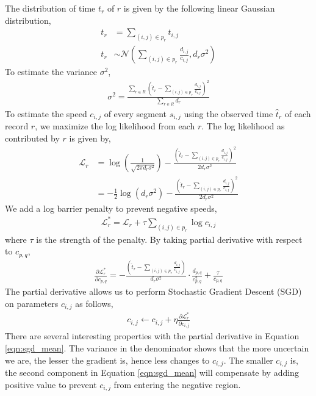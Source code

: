 \documentclass[conference]{IEEEtran.1.8}
\begin{document}
The distribution of time $t_r$ of $r$ is given by the following linear Gaussian distribution,
\begin{align*}
	t_r &= \sum_{ (i,j) \in p_r } t_{i,j} \\
	t_r &\sim \mathcal{N} \left( \sum_{ (i,j) \in p_r } \frac{ d_{i,j} }{ c_{i,j} }, d_r \sigma^2 \right)
\end{align*}
To estimate the variance $\sigma^2$,
\begin{align*}
	\sigma^2 = \frac{ \sum_{r \in R} \left( \hat{t}_r - \sum_{ (i,j) \in p_r } \frac{d_{i,j}}{c_{i,j}} \right)^2}{\sum_{r \in R} d_r}
\end{align*}
To estimate the speed $c_{i,j}$ of every segment $s_{i,j}$ using the observed time $\hat{t}_r$ of each record $r$, we maximize the log likelihood from each $r$. The log likelihood as contributed by $r$ is given by,
\begin{align*}
	\mathcal{L}_r &= \log \left( \frac{1}{\sqrt{2 \pi d_r \sigma^2 }} \right) - \frac{\left( \hat{t}_r - \sum_{ (i,j) \in p_r } \frac{d_{i,j}}{c_{i,j}} \right)^2}{2 d_r \sigma^2 } \\
	&= - \frac{1}{2} \log \left( d_r \sigma^2 \right) - \frac{\left( \hat{t}_r - \sum_{ (i,j) \in p_r } \frac{d_{i,j}}{c_{i,j}} \right)^2}{2 d_r \sigma^2 }
\end{align*}
We add a log barrier penalty to prevent negative speeds,
\begin{align}
	\label{eqn:objective1}
	\mathcal{L}^*_r = \mathcal{L}_r + \tau \sum_{(i,j) \in p_r} \log c_{i,j}
\end{align}
where $\tau$ is the strength of the penalty. By taking partial derivative with respect to $c_{p,q}$,
\begin{align}
	\label{eqn:sgd_mean}
	\frac{\partial \mathcal{L}^*_r}{\partial c_{p,q}} = - \frac{\left( \hat{t}_r - \sum_{ (i,j) \in p_r } \frac{d_{i,j}}{c_{i,j}} \right)}{d_r \sigma^2 } \cdot \frac{d_{p,q}}{c_{p,q}^2} + \frac{\tau}{c_{p,q}}
\end{align}
The partial derivative allows us to perform Stochastic Gradient Descent (SGD) on parameters $c_{i,j}$ as follows,
\begin{align*}
	c_{i,j} \leftarrow c_{i,j} + \eta \frac{\partial \mathcal{L}^*_r}{\partial c_{i,j}}
\end{align*}
There are several interesting properties with the partial derivative in Equation \ref{eqn:sgd_mean}. The variance in the denominator shows that the more uncertain we are, the lesser the gradient is, hence less changes to $c_{i,j}$. The smaller $c_{i,j}$ is, the second component in Equation \ref{eqn:sgd_mean} will compensate by adding positive value to prevent $c_{i,j}$ from entering the negative region.
\end{document}
